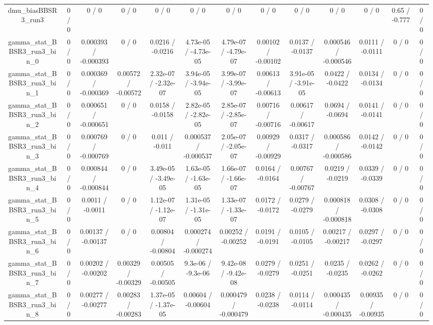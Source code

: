 \documentclass[10pt]{article}
\begin{document}
\begin{table}[htbp]
\begin{center}
\begin{tabular}{|c|c|c|c|c|c|c|c|c|c|c|c|c|}
  dmu_biasBBSR3_run3 & 0 / 0 & 0 / 0 & 0 / 0 & 0 / 0 & 0 / 0 & 0 / 0 & 0 / 0 & 0 / 0 & 0 / 0 & 0 / 0 & 0.65 / -0.777 & 0 / 0 \\ 
  gamma_stat_BBSR3_run3_bin_0 & 0 / 0 & 0.000393 / -0.000393 & 0 / 0 & 0.0216 / -0.0216 & 4.73e-05 / -4.73e-05 & 4.79e-07 / -4.79e-07 & 0.00102 / -0.00102 & 0.0137 / -0.0137 & 0.000546 / -0.000546 & 0.0111 / -0.0111 & 0 / 0 & 0 / 0 \\ 
  gamma_stat_BBSR3_run3_bin_1 & 0 / 0 & 0.000369 / -0.000369 & 0.00572 / -0.00572 & 2.32e-07 / -2.32e-07 & 3.94e-05 / -3.94e-05 & 3.99e-07 / -3.99e-07 & 0.00613 / -0.00613 & 3.91e-05 / -3.91e-05 & 0.0422 / -0.0422 & 0.0134 / -0.0134 & 0 / 0 & 0 / 0 \\ 
  gamma_stat_BBSR3_run3_bin_2 & 0 / 0 & 0.000651 / -0.000651 & 0 / 0 & 0.0158 / -0.0158 & 2.82e-05 / -2.82e-05 & 2.85e-07 / -2.85e-07 & 0.00716 / -0.00716 & 0.00617 / -0.00617 & 0.0694 / -0.0694 & 0.0141 / -0.0141 & 0 / 0 & 0 / 0 \\ 
  gamma_stat_BBSR3_run3_bin_3 & 0 / 0 & 0.000769 / -0.000769 & 0 / 0 & 0.011 / -0.011 & 0.000537 / -0.000537 & 2.05e-07 / -2.05e-07 & 0.00929 / -0.00929 & 0.0317 / -0.0317 & 0.000586 / -0.000586 & 0.0142 / -0.0142 & 0 / 0 & 0 / 0 \\ 
  gamma_stat_BBSR3_run3_bin_4 & 0 / 0 & 0.000844 / -0.000844 & 0 / 0 & 3.49e-05 / -3.49e-05 & 1.63e-05 / -1.63e-05 & 1.66e-07 / -1.66e-07 & 0.0164 / -0.0164 & 0.00767 / -0.00767 & 0.0219 / -0.0219 & 0.0339 / -0.0339 & 0 / 0 & 0 / 0 \\ 
  gamma_stat_BBSR3_run3_bin_5 & 0 / 0 & 0.0011 / -0.0011 & 0 / 0 & 1.12e-07 / -1.12e-07 & 1.31e-05 / -1.31e-05 & 1.33e-07 / -1.33e-07 & 0.0172 / -0.0172 & 0.0279 / -0.0279 & 0.000818 / -0.000818 & 0.0308 / -0.0308 & 0 / 0 & 0 / 0 \\ 
  gamma_stat_BBSR3_run3_bin_6 & 0 / 0 & 0.00137 / -0.00137 & 0 / 0 & 0.00804 / -0.00804 & 0.000274 / -0.000274 & 0.00252 / -0.00252 & 0.0191 / -0.0191 & 0.0105 / -0.0105 & 0.00217 / -0.00217 & 0.0297 / -0.0297 & 0 / 0 & 0 / 0 \\ 
  gamma_stat_BBSR3_run3_bin_7 & 0 / 0 & 0.00202 / -0.00202 & 0.00329 / -0.00329 & 0.00505 / -0.00505 & 9.3e-06 / -9.3e-06 & 9.42e-08 / -9.42e-08 & 0.0279 / -0.0279 & 0.0251 / -0.0251 & 0.0235 / -0.0235 & 0.0262 / -0.0262 & 0 / 0 & 0 / 0 \\ 
  gamma_stat_BBSR3_run3_bin_8 & 0 / 0 & 0.00277 / -0.00277 & 0.00283 / -0.00283 & 1.37e-05 / -1.37e-05 & 0.00604 / -0.00604 & 0.000479 / -0.000479 & 0.0238 / -0.0238 & 0.0114 / -0.0114 & 0.000435 / -0.000435 & 0.00935 / -0.00935 & 0 / 0 & 0 / 0 \\ 

\end{tabular}
\end{center}
\end{table}
\end{document}
